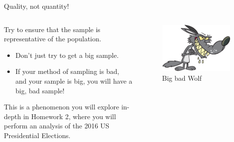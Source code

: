 \documentclass[aspectratio=169]{../latex_main/tntbeamer}  %
\begin{document}
	\begin{frame}{Quality, not quantity!}
	     \begin{columns}
	        \begin{column}{.4\textwidth}
	            Try to ensure that the sample is representative of the population.
                   \begin{itemize}
                       \item Don’t just try to get a big sample.
                       \item If your method of sampling is bad, and your sample is big, you will have a big, bad sample!
                   \end{itemize}
                   \bigskip
                   This is a phenomenon you will explore in-depth in Homework 2, where you will perform an analysis of the 2016 US Presidential Elections.


	        \end{column}
	        \begin{column}{.4\textwidth}
	               \begin{figure}
	                   \centering
	                   \includegraphics[scale=.4]{Bild10}
	                   \caption{Big bad Wolf}
	               \end{figure}
	        \end{column}
	        
	    \end{columns}
	\end{frame}
	
\end{document}
